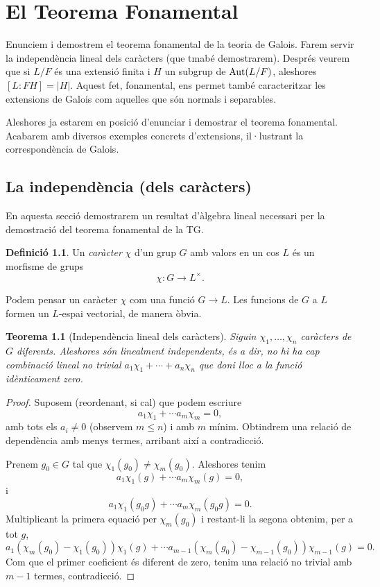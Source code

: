 \documentclass[
]{book}
\newtheorem{theorem}{Teorema}[chapter]
\theoremstyle{definition}
\newtheorem{definition}{Definició}[chapter]
\theoremstyle{definition}
\theoremstyle{definition}
\theoremstyle{definition}
\theoremstyle{remark}
\begin{document}
\hypertarget{el-teorema-fonamental}{%
\chapter{El Teorema Fonamental}\label{el-teorema-fonamental}}

Enunciem i demostrem el teorema fonamental de la teoria de Galois. Farem
servir la independència lineal dels caràcters (que tmabé demostrarem). Després veurem
que si \(L / F\) és una extensió finita i \(H\) un subgrup de \(\operatorname{Aut}(L/F)\), aleshores
\([L \colon FH] = |H|\). Aquest fet, fonamental, ens permet també caracteritzar
les extensions de Galois com aquelles que són normals i separables.

Aleshores ja estarem en posició d'enunciar i demostrar el teorema fonamental. Acabarem
amb diversos exemples concrets d'extensions, il·lustrant la correspondència de Galois.

\hypertarget{la-independuxe8ncia-dels-caruxe0cters}{%
\section{La independència (dels caràcters)}\label{la-independuxe8ncia-dels-caruxe0cters}}

En aquesta secció demostrarem un resultat d'àlgebra lineal necessari per la demostració del teorema fonamental de la TG.

\begin{definition}
\protect\hypertarget{def:caracter}{}\label{def:caracter}Un \emph{caràcter} \(\chi\) d'un grup \(G\) amb valors en un cos \(L\) és un morfisme de grups
\[
\chi \colon G \to L^\times.
\]
\end{definition}

Podem pensar un caràcter \(\chi\) com una funció \(G\to L\). Les funcions de \(G\) a \(L\) formen un \(L\)-espai vectorial, de manera òbvia.

\begin{theorem}[Independència lineal dels caràcters]
\protect\hypertarget{thm:caracters-li}{}\label{thm:caracters-li}Siguin \(\chi_1,\ldots,\chi_n\) caràcters de \(G\) diferents. Aleshores són linealment independents, és a dir, no hi ha
cap combinació lineal no trivial \(a_1\chi_1+\cdots+a_n\chi_n\) que doni lloc a la funció idènticament zero.
\end{theorem}

\begin{proof}
Suposem (reordenant, si cal) que podem escriure
\[
a_1\chi_1 + \cdots a_m\chi_m = 0,
\]
amb tots els \(a_i\neq 0\) (observem \(m\leq n\)) i amb \(m\) mínim. Obtindrem una relació de dependència amb menys termes, arribant així a contradicció.

Prenem \(g_0\in G\) tal que \(\chi_1(g_0)\neq \chi_m(g_0)\). Aleshores tenim
\[
a_1\chi_1(g) + \cdots a_m\chi_m(g) = 0,
\]
i
\[
a_1\chi_1(g_0g) + \cdots a_m\chi_m(g_0g) = 0.
\]
Multiplicant la primera equació per \(\chi_m(g_0)\) i restant-li la segona obtenim, per a tot \(g\),
\[
a_1(\chi_m(g_0)-\chi_1(g_0)) \chi_1(g) + \cdots a_{m-1}(\chi_m(g_0)- \chi_{m-1}(g_0)) \chi_{m-1}(g) = 0.
\]
Com que el primer coeficient és diferent de zero, tenim una relació no trivial amb \(m-1\) termes, contradicció.
\end{proof}
\end{document}
